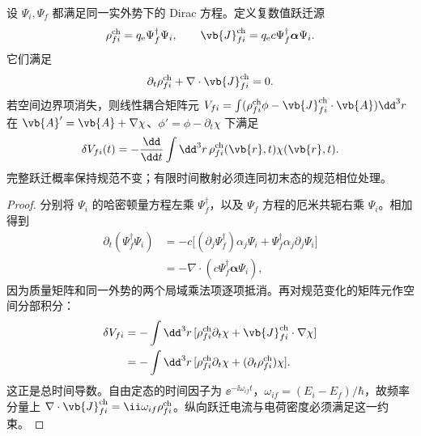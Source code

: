 \begin{proposition}[跃迁电流的连续性与规范端点项]
设 $\Psi_i,\Psi_f$ 都满足同一实外势下的 Dirac 方程。定义复数值跃迁源
\begin{equation*}
 \rho_{fi}^{\rm ch}=q_{\mathrm e}\Psi_f^\dagger\Psi_i,
 \qquad \vb{J}_{fi}^{\rm ch}=q_{\mathrm e}c\Psi_f^\dagger\boldsymbol\alpha\Psi_i.
\end{equation*}
它们满足
\begin{equation}
 \partial_t\rho_{fi}^{\rm ch}+\nabla\cdot\vb{J}_{fi}^{\rm ch}=0.
 \label{eq:feqo-transition-current-continuity}
\end{equation}
若空间边界项消失，则线性耦合矩阵元
$V_{fi}=\int(\rho_{fi}^{\rm ch}\phi-\vb{J}_{fi}^{\rm ch}\cdot\vb{A})\dd^3r$
在 $\vb{A}' =\vb{A}+\nabla\chi$、$\phi'=\phi-\partial_t\chi$ 下满足
\begin{equation}
 \delta V_{fi}(t)=-\frac{\dd}{\dd t}\int\dd^3r\,\rho_{fi}^{\rm ch}(\vb{r},t)\chi(\vb{r},t).
 \label{eq:feqo-transition-gauge-endpoint}
\end{equation}
完整跃迁概率保持规范不变；有限时间散射必须连同初末态的规范相位处理。
\end{proposition}

\begin{proof}
分别将 $\Psi_i$ 的哈密顿量方程左乘 $\Psi_f^\dagger$，以及 $\Psi_f$ 方程的厄米共轭右乘 $\Psi_i$。相加得到
\begin{align*}
 \partial_t(\Psi_f^\dagger\Psi_i)
 &=-c\big[(\partial_j\Psi_f^\dagger)\alpha_j\Psi_i
 +\Psi_f^\dagger\alpha_j\partial_j\Psi_i\big]\\
 &=-\nabla\cdot(c\Psi_f^\dagger\boldsymbol\alpha\Psi_i),
\end{align*}
因为质量矩阵和同一外势的两个局域乘法项逐项抵消。再对规范变化的矩阵元作空间分部积分：
\begin{align*}
 \delta V_{fi}
 &=-\int\dd^3r\,[\rho_{fi}^{\rm ch}\partial_t\chi
 +\vb{J}_{fi}^{\rm ch}\cdot\nabla\chi]\\
 &=-\int\dd^3r\,[\rho_{fi}^{\rm ch}\partial_t\chi
 +(\partial_t\rho_{fi}^{\rm ch})\chi].
\end{align*}
这正是总时间导数。自由定态的时间因子为 $\ee^{-\ii\omega_{if}t}$，$\omega_{if}=(E_i-E_f)/\hbar$，故频率分量上 $\nabla\cdot\vb{J}_{fi}^{\rm ch}=\ii\omega_{if}\rho_{fi}^{\rm ch}$。纵向跃迁电流与电荷密度必须满足这一约束。
\end{proof}

